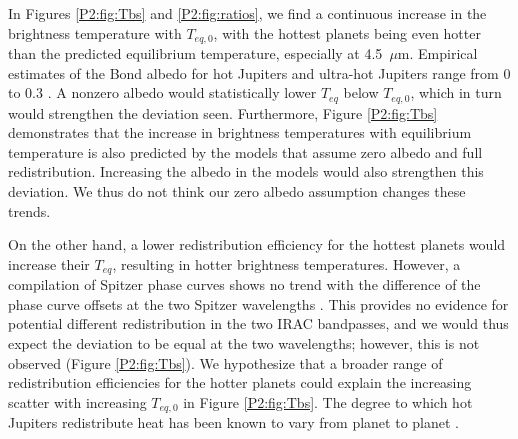 In Figures \ref{P2:fig:Tbs} and \ref{P2:fig:ratios}, we find a continuous increase in the brightness temperature with $T_{eq,\textit{0}}$, with the hottest planets being even hotter than the predicted equilibrium temperature, especially at 4.5~$\mu$m. Empirical estimates of the Bond albedo for hot Jupiters and ultra-hot Jupiters range from 0 to 0.3 \citep{Schwartz2015, Schwartz2017}. A nonzero albedo would statistically lower $T_{eq}$ below $T_{eq,\textit{0}}$, which in turn would strengthen the deviation seen. Furthermore, Figure \ref{P2:fig:Tbs} demonstrates that the increase in brightness temperatures with equilibrium temperature is also predicted by the models that assume zero albedo and full redistribution. Increasing the albedo in the models would also strengthen this deviation. We thus do not think our zero albedo assumption  changes these trends.

On the other hand, a lower redistribution efficiency for the hottest planets would increase their $T_{eq}$, resulting in hotter brightness temperatures. However, a compilation of Spitzer phase curves shows no trend with the difference of the phase curve offsets at the two Spitzer wavelengths \citep{Beatty2019, Zhang2018a}. This provides no evidence for potential different redistribution in the two IRAC bandpasses, and we would thus expect the deviation to be equal at the two wavelengths; however,  this is not observed (Figure \ref{P2:fig:Tbs}).
We hypothesize that a broader range of redistribution efficiencies for the hotter planets could explain the increasing scatter with increasing $T_{eq,\textit{0}}$ in Figure \ref{P2:fig:Tbs}. The degree to which hot Jupiters redistribute heat has been known to vary from planet to planet \citep{Showman2002, Cowan2007, Cowan2011b, Knutson2007, Showman2011}.

